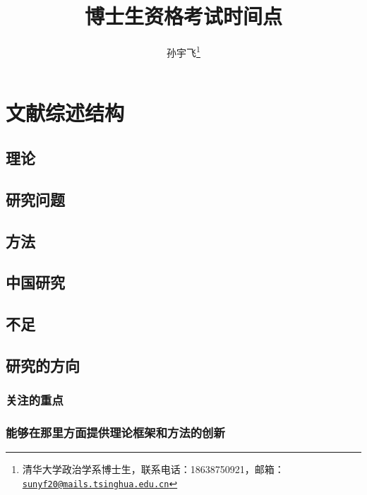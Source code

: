 \documentclass[
  12pt,
]{ctexart}
\title{博士生资格考试时间点}
\author{孙宇飞\footnote{清华大学政治学系博士生，联系电话：18638750921，邮箱：\href{mailto:sunyf20@mails.tsinghua.edu.cn}{\nolinkurl{sunyf20@mails.tsinghua.edu.cn}}}}
\date{}
\begin{document}
\maketitle

\hypertarget{ux6587ux732eux7efcux8ff0ux7ed3ux6784}{%
\section{文献综述结构}\label{ux6587ux732eux7efcux8ff0ux7ed3ux6784}}

\hypertarget{ux7406ux8bba}{%
\subsection{理论}\label{ux7406ux8bba}}

\hypertarget{ux7814ux7a76ux95eeux9898}{%
\subsection{研究问题}\label{ux7814ux7a76ux95eeux9898}}

\hypertarget{ux65b9ux6cd5}{%
\subsection{方法}\label{ux65b9ux6cd5}}

\hypertarget{ux4e2dux56fdux7814ux7a76}{%
\subsection{中国研究}\label{ux4e2dux56fdux7814ux7a76}}

\hypertarget{ux4e0dux8db3}{%
\subsection{不足}\label{ux4e0dux8db3}}

\hypertarget{ux7814ux7a76ux7684ux65b9ux5411}{%
\subsection{研究的方向}\label{ux7814ux7a76ux7684ux65b9ux5411}}

\hypertarget{ux5173ux6ce8ux7684ux91cdux70b9}{%
\subsubsection{关注的重点}\label{ux5173ux6ce8ux7684ux91cdux70b9}}

\hypertarget{ux80fdux591fux5728ux90a3ux91ccux65b9ux9762ux63d0ux4f9bux7406ux8bbaux6846ux67b6ux548cux65b9ux6cd5ux7684ux521bux65b0}{%
\subsubsection{能够在那里方面提供理论框架和方法的创新}\label{ux80fdux591fux5728ux90a3ux91ccux65b9ux9762ux63d0ux4f9bux7406ux8bbaux6846ux67b6ux548cux65b9ux6cd5ux7684ux521bux65b0}}
\end{document}
